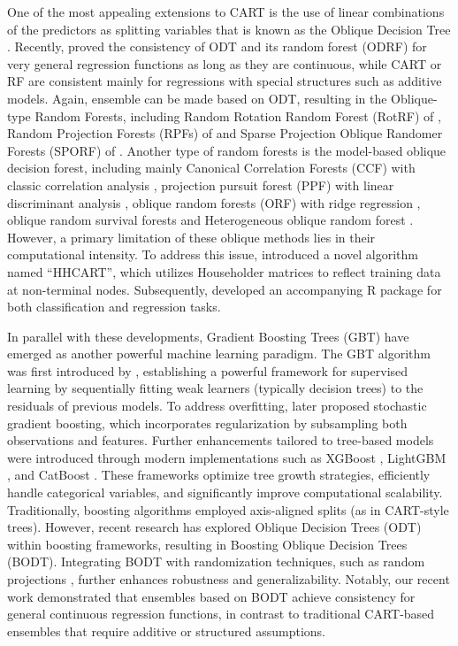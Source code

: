 One of the most appealing extensions to CART is the use of linear combinations of the predictors as splitting variables that is known as the Oblique Decision Tree  \citep[{ODT}]{Heath93inductionof}. Recently, \citet{zhan2022consistency} proved the consistency of {ODT} and its random forest ({ODRF}) for very general regression functions as long as they  are continuous, while CART or RF are consistent mainly for regressions with special structures such as additive models.  Again, ensemble can be made based on ODT, resulting in the Oblique-type Random Forests, including Random Rotation Random Forest ({RotRF}) of \cite{blaser2016random}, Random Projection Forests ({RPFs}) of \citet{lee2015fast} and Sparse Projection Oblique Randomer Forests (SPORF) of \cite{tomita2020sparse}. Another type of random forests is the model-based oblique decision forest,  including mainly Canonical Correlation Forests ({CCF}) with classic correlation analysis \citep{rainforth2015canonical},  projection pursuit forest ({PPF}) with linear discriminant analysis \citep{silva2021projection}, oblique random forests ({ORF}) with ridge regression \citep{menze2011oblique}, oblique random survival forests  \citep[{ORSF}]{jaeger2022accelerated} and Heterogeneous oblique random forest \citep[{HORF}]{katuwal2020heterogeneous}. {However, a primary limitation of these oblique methods lies in their computational intensity. To address this issue, \citet{HHCART} introduced a novel algorithm named ``HHCART'', which utilizes Householder matrices to reflect training data at non-terminal nodes. Subsequently, \citet{HHCARTR} developed an accompanying R package  for both classification and regression tasks.}

In parallel with these developments, Gradient Boosting Trees (GBT) have emerged as another powerful machine learning paradigm. The GBT algorithm was first introduced by \cite{friedman2001greedy}, establishing a powerful framework for supervised learning by sequentially fitting weak learners (typically decision trees) to the residuals of previous models. To address overfitting, \cite{friedman2002stochastic} later proposed stochastic gradient boosting, which incorporates regularization by subsampling both observations and features.
Further enhancements tailored to tree-based models were introduced through modern implementations such as XGBoost \citep{chen2016xgboost}, LightGBM \citep{ke2017lightgbm}, and CatBoost \citep{prokhorenkova2018catboost}. These frameworks optimize tree growth strategies, efficiently handle categorical variables, and significantly improve computational scalability.
Traditionally, boosting algorithms employed axis-aligned splits (as in CART-style trees). However, recent research has explored Oblique Decision Trees (ODT) within boosting frameworks, resulting in Boosting Oblique Decision Trees (BODT). Integrating BODT with randomization techniques, such as random projections \citep{lee2015fast}, further enhances robustness and generalizability.
Notably, our recent work demonstrated that ensembles based on BODT achieve consistency for general continuous regression functions, in contrast to traditional CART-based ensembles that require additive or structured assumptions.


